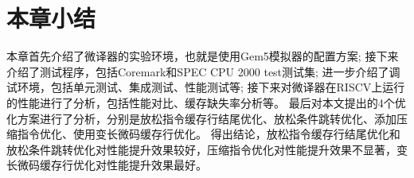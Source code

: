 \section{本章小结}

本章首先介绍了微译器的实验环境，也就是使用Gem5模拟器的配置方案;
接下来介绍了测试程序，包括Coremark和SPEC CPU 2000 test测试集;
进一步介绍了调试环境，包括单元测试、集成测试、性能测试等;
接下来对微译器在RISCV上运行的性能进行了分析，包括性能对比、缓存缺失率分析等。
最后对本文提出的4个优化方案进行了分析，分别是放松指令缓存行结尾优化、放松条件跳转优化、添加压缩指令优化、使用变长微码缓存行优化。
得出结论，放松指令缓存行结尾优化和放松条件跳转优化对性能提升效果较好，压缩指令优化对性能提升效果不显著，变长微码缓存行优化对性能提升效果最好。
